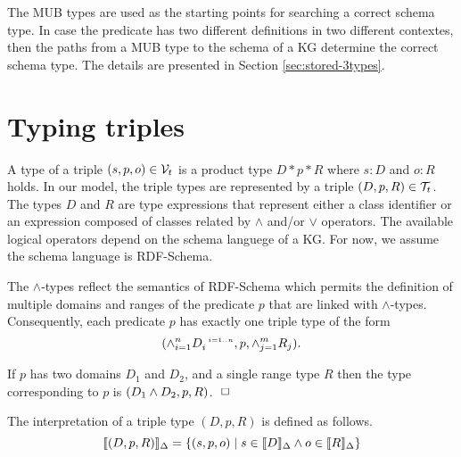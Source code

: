 \documentclass[runningheads]{llncs}
\newcommand{\s}{\scriptscriptstyle\ \,}
\newcommand{\llb}{\llbracket}
\newcommand{\rrb}{\rrbracket}
\newcommand{\V}{{\cal V}}
\newcommand{\T}{{\cal T}}
\newcommand{\finbox}{\phantom{.}\hfill\Box}
\newcommand{\memo}[1]{}
\begin{document}
\memo{
The individual MUB types derived by the above rule are gathered
into one $\land$ type of MUB types by using the following rule.

\begin{equation}
\label{rul:join-gather}
\dfrac{I\in\V_i\quad\/S_i^{\s\/i=1..m}\in\T_i\quad\forall\/i=1..m,\, I:_\sqcup\/S_i}
{I:_{\sqcup}\land_{i=1}^m\/S_i}
\end{equation}}

The MUB types are used as the starting points for searching a correct
schema type. In case the predicate has two different definitions in
two different contextes, then the paths from a MUB type to the schema
of a KG determine the correct schema type. The details are presented
in Section \ref{sec:stored-3types}.






\section{Typing triples\label{sec:triples}}



A type of a triple $(s,p,o)\in\V_t$ is a product type $D*p*R$
where $s:D$ and $o:R$ holds. In our model, the triple types are
represented by a triple $(D,p,R)\in\T_t$. The types $D$ and $R$ are
type expressions that represent either a class identifier or an 
expression composed of classes related by $\land$ and/or $\lor$
operators. The available logical operators depend on the schema
languege of a KG. For now, we assume the schema language is
RDF-Schema.

The $\land$-types reflect the semantics of RDF-Schema \cite{rdfschema}
which permits the definition of multiple domains and ranges of the
predicate $p$ that are linked with $\land$-types. Consequently, each
predicate $p$ has exactly one triple type of the form
$$(\land_{i=1}^n\/D_i^{\s\/i=1..n}, p ,\land_{j=1}^m\/R_j).$$

\begin{example}
  If $p$ has two domains $D_1$ and $D_2$, and a single
range type $R$ then the type corresponding to $p$ is
$(D_1\land\/D_2,p,R)$. $\finbox$
\end{example}

\noindent
The interpretation of a triple type $(D,p,R)$ is defined as
follows.
$$\llb(D,p,R)\rrb_\Delta=\{(s,p,o)\mid\/s\in\llb\/D\rrb_\Delta\land\/o\in\llb\/R\rrb_\Delta \}$$
\end{document}
